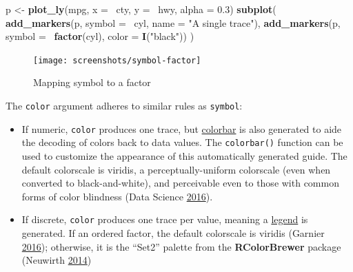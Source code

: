 \documentclass[12pt,]{isuthesis}
\newenvironment{Shaded}{\begin{snugshade}}{\end{snugshade}}
\newcommand{\KeywordTok}[1]{\textcolor[rgb]{0.13,0.29,0.53}{\textbf{{#1}}}}
\newcommand{\DataTypeTok}[1]{\textcolor[rgb]{0.13,0.29,0.53}{{#1}}}
\newcommand{\FloatTok}[1]{\textcolor[rgb]{0.00,0.00,0.81}{{#1}}}
\newcommand{\StringTok}[1]{\textcolor[rgb]{0.31,0.60,0.02}{{#1}}}
\newcommand{\NormalTok}[1]{{#1}}
\begin{document}
\begin{Shaded}
\begin{Highlighting}[]
\NormalTok{p <-}\StringTok{ }\KeywordTok{plot_ly}\NormalTok{(mpg, }\DataTypeTok{x =} \NormalTok{~cty, }\DataTypeTok{y =} \NormalTok{~hwy, }\DataTypeTok{alpha =} \FloatTok{0.3}\NormalTok{) }
\KeywordTok{subplot}\NormalTok{(}
  \KeywordTok{add_markers}\NormalTok{(p, }\DataTypeTok{symbol =} \NormalTok{~cyl, }\DataTypeTok{name =} \StringTok{"A single trace"}\NormalTok{),}
  \KeywordTok{add_markers}\NormalTok{(p, }\DataTypeTok{symbol =} \NormalTok{~}\KeywordTok{factor}\NormalTok{(cyl), }\DataTypeTok{color =} \KeywordTok{I}\NormalTok{(}\StringTok{"black"}\NormalTok{))}
\NormalTok{)}
\end{Highlighting}
\end{Shaded}

\begin{figure}
\centering
\texttt{[image: screenshots/symbol-factor]}
\caption{\label{fig:symbol-factor}Mapping symbol to a factor}
\end{figure}

The \texttt{color} argument adheres to similar rules as \texttt{symbol}:

\begin{itemize}
\item
  If numeric, \texttt{color} produces one trace, but
  \href{https://plot.ly/r/reference/\#scatter-marker-colorbar}{colorbar}
  is also generated to aide the decoding of colors back to data values.
  The \texttt{colorbar()} function can be used to customize the
  appearance of this automatically generated guide. The default
  colorscale is viridis, a perceptually-uniform colorscale (even when
  converted to black-and-white), and perceivable even to those with
  common forms of color blindness (Data Science
  \protect\hyperlink{ref-viridis}{2016}).
\item
  If discrete, \texttt{color} produces one trace per value, meaning a
  \href{https://plot.ly/r/reference/\#layout-legend}{legend} is
  generated. If an ordered factor, the default colorscale is viridis
  (Garnier \protect\hyperlink{ref-viridisLite}{2016}); otherwise, it is
  the ``Set2'' palette from the \textbf{RColorBrewer} package (Neuwirth
  \protect\hyperlink{ref-RColorBrewer}{2014})
\end{itemize}
\end{document}
